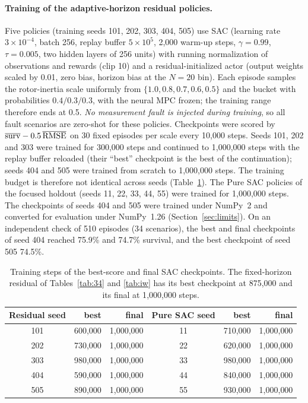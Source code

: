\documentclass[preprint,12pt,authoryear=false]{elsarticle}
\theoremstyle{remark}\newtheorem{remark}{Remark}
\theoremstyle{plain}\newtheorem{proposition}{Proposition}\newtheorem{lemma}{Lemma}
\theoremstyle{definition}\newtheorem{assumption}{Assumption}
\begin{document}
\paragraph{Training of the adaptive-horizon residual policies.}
Five policies (training seeds 101, 202, 303, 404, 505) use SAC (learning rate $3\times10^{-4}$, batch 256, replay buffer $5\times10^5$, 2{,}000 warm-up steps, $\gamma=0.99$, $\tau=0.005$, two hidden layers of 256 units) with running normalization of observations and rewards (clip 10) and a residual-initialized actor (output weights scaled by 0.01, zero bias, horizon bias at the $N=20$ bin). Each episode samples the rotor-inertia scale uniformly from $\{1.0,0.8,0.7,0.6,0.5\}$ and the bucket with probabilities $0.4/0.3/0.3$, with the neural MPC frozen; the training range therefore ends at 0.5. \emph{No measurement fault is injected during training}, so all fault scenarios are zero-shot for these policies. Checkpoints were scored by $\overline{\rm surv}-0.5\,\overline{\rm RMSE}$ on 30 fixed episodes per scale every 10{,}000 steps. Seeds 101, 202 and 303 were trained for 300{,}000 steps and continued to 1{,}000{,}000 steps with the replay buffer reloaded (their ``best'' checkpoint is the best of the continuation); seeds 404 and 505 were trained from scratch to 1{,}000{,}000 steps. The training budget is therefore not identical across seeds (Table~\ref{tab:steps}). The Pure SAC policies of the focused holdout (seeds 11, 22, 33, 44, 55) were trained for 1{,}000{,}000 steps. The checkpoints of seeds 404 and 505 were trained under NumPy~2 and converted for evaluation under NumPy~1.26 (Section~\ref{sec:limits}). On an independent check of 510 episodes (34 scenarios), the best and final checkpoints of seed 404 reached 75.9\% and 74.7\% survival, and the best checkpoint of seed 505 74.5\%.

\begin{table}[t]\centering\small
\caption{Training steps of the best-score and final SAC checkpoints. The fixed-horizon residual of Tables~\ref{tab:34} and \ref{tab:iw} has its best checkpoint at 875{,}000 and its final at 1{,}000{,}000 steps.}\label{tab:steps}
\begin{tabular}{crrcrr}\toprule
Residual seed & best & final & Pure SAC seed & best & final\\\midrule
101 & 600{,}000 & 1{,}000{,}000 & 11 & 710{,}000 & 1{,}000{,}000\\
202 & 730{,}000 & 1{,}000{,}000 & 22 & 620{,}000 & 1{,}000{,}000\\
303 & 980{,}000 & 1{,}000{,}000 & 33 & 980{,}000 & 1{,}000{,}000\\
404 & 590{,}000 & 1{,}000{,}000 & 44 & 840{,}000 & 1{,}000{,}000\\
505 & 890{,}000 & 1{,}000{,}000 & 55 & 930{,}000 & 1{,}000{,}000\\\bottomrule
\end{tabular}
\end{table}
\end{document}
